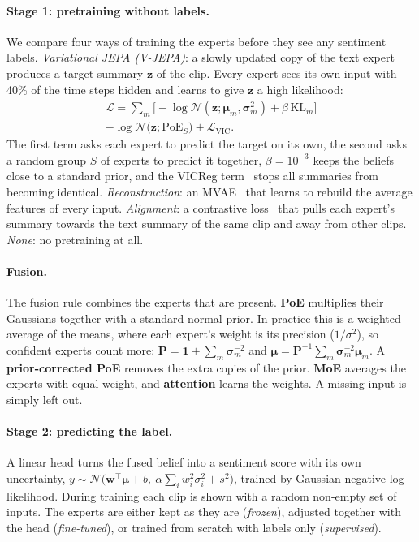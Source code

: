 \documentclass[10pt,twocolumn]{article}
\begin{document}
\paragraph{Stage 1: pretraining without labels.} We compare four ways of training the experts before they see any
sentiment labels. \emph{Variational JEPA (V-JEPA)}: a slowly updated copy of the text expert produces a target summary
$\bm z$ of the clip. Every expert sees its own input with 40\% of the time steps hidden and learns to give $\bm z$ a high
likelihood:
\begin{multline}
\mathcal{L} = \sum_{m}\Big[-\log\mathcal{N}(\bm z;\bm\mu_m,\bm\sigma_m^2) + \beta\,\mathrm{KL}_m\Big]\\
 - \log\mathcal{N}\big(\bm z;\mathrm{PoE}_{S}\big) + \mathcal{L}_{\mathrm{VIC}}.
\end{multline}
The first term asks each expert to predict the target on its own, the second asks a random group $S$ of experts to
predict it together, $\beta=10^{-3}$ keeps the beliefs close to a standard prior, and the VICReg term~\cite{bardes2022vicreg}
stops all summaries from becoming identical. \emph{Reconstruction}: an MVAE~\cite{wu2018mvae} that learns to rebuild the
average features of every input. \emph{Alignment}: a contrastive loss~\cite{oord2018cpc} that pulls each expert's summary
towards the text summary of the same clip and away from other clips. \emph{None}: no pretraining at all.

\paragraph{Fusion.} The fusion rule combines the experts that are present. \textbf{PoE} multiplies their Gaussians
together with a standard-normal prior. In practice this is a weighted average of the means, where each expert's weight
is its precision ($1/\sigma^2$), so confident experts count more:
$\bm P=\bm 1+\sum_m\bm\sigma_m^{-2}$ and $\bm\mu=\bm P^{-1}\sum_m\bm\sigma_m^{-2}\bm\mu_m$. A \textbf{prior-corrected PoE}
removes the extra copies of the prior. \textbf{MoE} averages the experts with equal weight, and \textbf{attention} learns
the weights. A missing input is simply left out.

\paragraph{Stage 2: predicting the label.} A linear head turns the fused belief into a sentiment score with its own
uncertainty, $y\sim\mathcal{N}\big(\bm w^\top\bm\mu+b,\ \alpha\sum_i w_i^2\sigma_i^2+s^2\big)$, trained by Gaussian negative
log-likelihood. During training each clip is shown with a random non-empty set of inputs. The experts are either kept as
they are (\emph{frozen}), adjusted together with the head (\emph{fine-tuned}), or trained from scratch with labels only
(\emph{supervised}).
\end{document}

